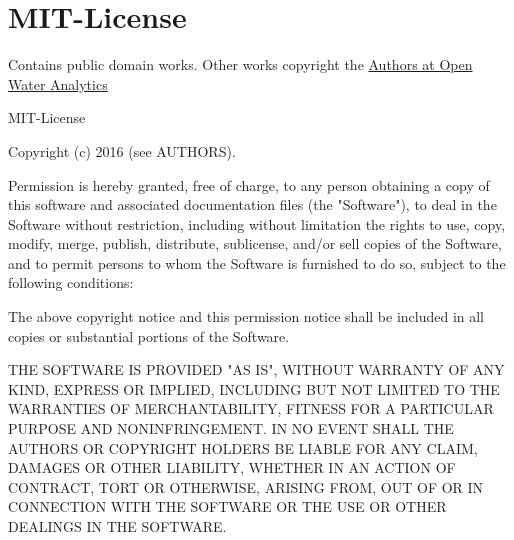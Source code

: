 \hypertarget{group___m_i_t-_license}{}\section{M\+I\+T-\/\+License}
\label{group___m_i_t-_license}
Contains public domain works. Other works copyright the \hyperlink{group___a_u_t_h_o_r_s}{Authors at Open Water Analytics}

\begin{DoxyVerb}MIT-License

Copyright (c) 2016 (see AUTHORS).

Permission is hereby granted, free of charge, to any person obtaining a copy
of this software and associated documentation files (the "Software"), to deal
in the Software without restriction, including without limitation the rights
to use, copy, modify, merge, publish, distribute, sublicense, and/or sell
copies of the Software, and to permit persons to whom the Software is
furnished to do so, subject to the following conditions:

The above copyright notice and this permission notice shall be included in all
copies or substantial portions of the Software.

THE SOFTWARE IS PROVIDED "AS IS", WITHOUT WARRANTY OF ANY KIND, EXPRESS OR
IMPLIED, INCLUDING BUT NOT LIMITED TO THE WARRANTIES OF MERCHANTABILITY,
FITNESS FOR A PARTICULAR PURPOSE AND NONINFRINGEMENT. IN NO EVENT SHALL THE
AUTHORS OR COPYRIGHT HOLDERS BE LIABLE FOR ANY CLAIM, DAMAGES OR OTHER
LIABILITY, WHETHER IN AN ACTION OF CONTRACT, TORT OR OTHERWISE, ARISING FROM,
OUT OF OR IN CONNECTION WITH THE SOFTWARE OR THE USE OR OTHER DEALINGS IN THE
SOFTWARE.
\end{DoxyVerb}
 